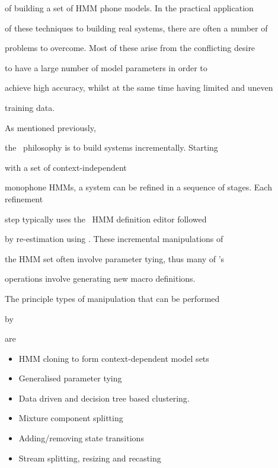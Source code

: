 of building a set of HMM phone models.  In the practical application


of these techniques to building real systems, there are often a number of  


problems to overcome.  Most of these arise from the conflicting desire


to have a large number of model parameters in order to


achieve high accuracy, whilst at the same time having limited and uneven


training data. 





As mentioned previously,


the \HTK\ philosophy is to build systems incrementally.  Starting 


with a set of context-independent 


monophone HMMs, a system can be refined in a sequence of stages.  Each refinement


step typically uses the \HTK\ HMM definition editor  followed


by re-estimation using .  These incremental manipulations of


the HMM set often involve parameter tying, thus many of 's


operations involve generating new macro definitions.





The principle types of manipulation that can be performed 


by 


are 


\begin{itemize}


\item HMM cloning to form context-dependent model sets


\item Generalised parameter tying


\item Data driven and decision tree based clustering.


\item Mixture component splitting


\item Adding/removing state transitions


\item Stream splitting, resizing and recasting


\end{itemize}


